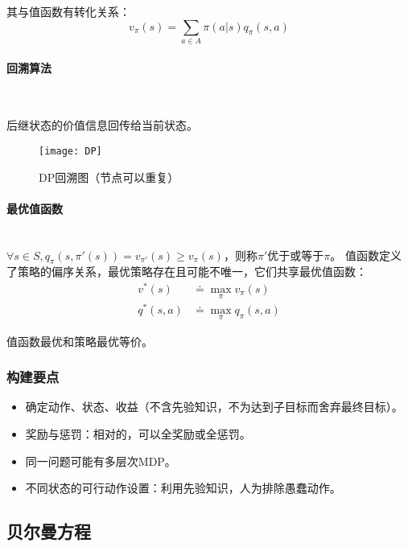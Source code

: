 \documentclass[
12pt, %
a4paper, 
oneside, %
headinclude,footinclude, %
]{scrartcl}
\begin{document}
其与值函数有转化关系：
$$ v_\pi(s) = \sum_{a \in A} \pi(a|s) q_\pi(s, a) $$
\paragraph{回溯算法}~\\
\begin{minipage}{0.3\textwidth}
\hspace{2em}
后继状态的价值信息回传给当前状态。
\end{minipage}
\hfill
\begin{minipage}{0.6\textwidth}
\begin{figure}[H]
\centering 
\texttt{[image: DP]} 
\caption[DP回溯图]{DP回溯图（节点可以重复）}
\end{figure}
\end{minipage}
\paragraph{最优值函数}~\\

$ \forall s \in S, q_{\pi}(s, \pi'(s)) = v_{\pi'}(s) \geq v_{\pi}(s) $，则称$ \pi' $优于或等于$ \pi $。
值函数定义了策略的偏序关系，最优策略存在且可能不唯一，它们共享最优值函数：
\begin{align*}
v^*(s) &\doteq \max_{\pi} v_{\pi}(s) \\
q^*(s, a) &\doteq \max_{\pi} q_{\pi}(s, a) 
\end{align*}

值函数最优和策略最优等价。
\subsubsection{构建要点}
\begin{itemize}
\item 确定动作、状态、收益（不含先验知识，不为达到子目标而舍弃最终目标）。
\item 奖励与惩罚：相对的，可以全奖励或全惩罚。
\item 同一问题可能有多层次MDP。
\item 不同状态的可行动作设置：利用先验知识，人为排除愚蠢动作。
\end{itemize}
\subsection{贝尔曼方程}
\end{document}
